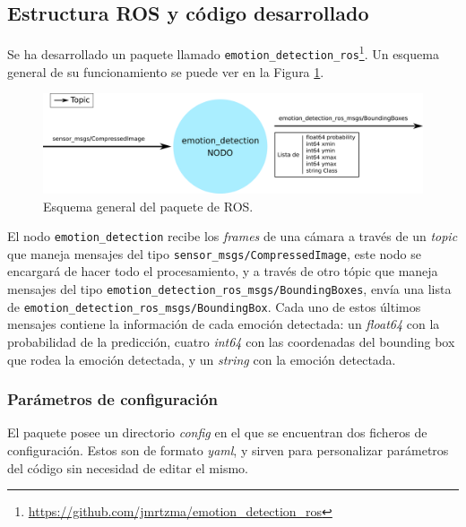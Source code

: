 \subsection{Estructura ROS y código desarrollado}

Se ha desarrollado un paquete llamado \verb|emotion_detection_ros|\footnote{\url{https://github.com/jmrtzma/emotion_detection_ros}}. Un esquema general de su funcionamiento se puede ver en la Figura \ref{fig:esquema_paquete_ROS}.\\

\begin{figure} [h!]
  \begin{center}
    \includegraphics[width=15cm]{figs/paquete_ros.png}
  \end{center}
  \captionsetup{justification=centering}
  \caption{Esquema general del paquete de ROS.}
  \label{fig:esquema_paquete_ROS}
\end{figure}

El nodo \verb|emotion_detection| recibe los \textit{frames} de una cámara a través de un \textit{topic} que maneja mensajes del tipo \verb|sensor_msgs/CompressedImage|, este nodo se encargará de hacer todo el procesamiento, y a través de otro tópic que maneja mensajes del tipo \verb|emotion_detection_ros_msgs/BoundingBoxes|, envía una lista de \verb|emotion_detection_ros_msgs/BoundingBox|. Cada uno de estos últimos mensajes contiene la información de cada emoción detectada: un \textit{float64} con la probabilidad de la predicción, cuatro \textit{int64} con las coordenadas del bounding box que rodea la emoción detectada, y un \textit{string} con la emoción detectada.

\subsubsection{Parámetros de configuración}

El paquete posee un directorio \textit{config} en el que se encuentran dos ficheros de configuración. Estos son de formato \textit{yaml}, y sirven para personalizar parámetros del código sin necesidad de editar el mismo.\\

